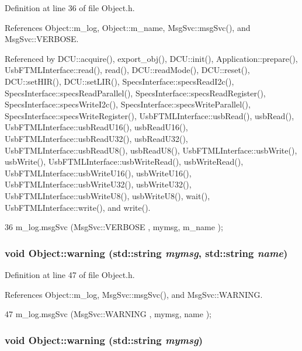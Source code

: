 Definition at line 36 of file Object.h.

References Object::m\_\-log, Object::m\_\-name, MsgSvc::msgSvc(), and MsgSvc::VERBOSE.

Referenced by DCU::acquire(), export\_\-obj(), DCU::init(), Application::prepare(), UsbFTMLInterface::read(), read(), DCU::readMode(), DCU::reset(), DCU::setHIR(), DCU::setLIR(), SpecsInterface::specsReadI2c(), SpecsInterface::specsReadParallel(), SpecsInterface::specsReadRegister(), SpecsInterface::specsWriteI2c(), SpecsInterface::specsWriteParallel(), SpecsInterface::specsWriteRegister(), UsbFTMLInterface::usbRead(), usbRead(), UsbFTMLInterface::usbReadU16(), usbReadU16(), UsbFTMLInterface::usbReadU32(), usbReadU32(), UsbFTMLInterface::usbReadU8(), usbReadU8(), UsbFTMLInterface::usbWrite(), usbWrite(), UsbFTMLInterface::usbWriteRead(), usbWriteRead(), UsbFTMLInterface::usbWriteU16(), usbWriteU16(), UsbFTMLInterface::usbWriteU32(), usbWriteU32(), UsbFTMLInterface::usbWriteU8(), usbWriteU8(), wait(), UsbFTMLInterface::write(), and write().


\begin{DoxyCode}
36 { m_log.msgSvc (MsgSvc::VERBOSE , mymsg, m_name ); }
\end{DoxyCode}
\hypertarget{classObject_a11f101db4dd73d9391b0231818881d86}{
\subsubsection[{warning}]{\setlength{\rightskip}{0pt plus 5cm}void Object::warning (std::string {\em mymsg}, \/  std::string {\em name})}}
\label{classObject_a11f101db4dd73d9391b0231818881d86}


Definition at line 47 of file Object.h.

References Object::m\_\-log, MsgSvc::msgSvc(), and MsgSvc::WARNING.


\begin{DoxyCode}
47 { m_log.msgSvc (MsgSvc::WARNING , mymsg, name ); }
\end{DoxyCode}
\hypertarget{classObject_a65cd4fda577711660821fd2cd5a3b4c9}{
\subsubsection[{warning}]{\setlength{\rightskip}{0pt plus 5cm}void Object::warning (std::string {\em mymsg})}}
\label{classObject_a65cd4fda577711660821fd2cd5a3b4c9}


